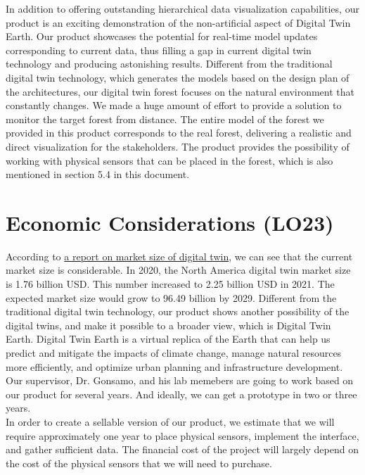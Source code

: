\documentclass{article}
\begin{document}
\noindent In addition to offering outstanding hierarchical data visualization capabilities, our product is an exciting demonstration of the non-artificial aspect of Digital Twin Earth. Our product showcases the potential for real-time model updates corresponding to current data, thus filling a gap in current digital twin technology and producing astonishing results. Different from the traditional digital twin technology, which generates the models based on the design plan of the architectures, our digital twin forest focuses on the natural environment that constantly changes. We made a huge amount of effort to provide a solution to monitor the target forest from distance. The entire model of the forest we provided in this product corresponds to the real forest, delivering a realistic and direct visualization for the stakeholders. The product provides the possibility of working with physical sensors that can be placed in the forest, which is also mentioned in section 5.4 in this document.

\noindent 


\section{Economic Considerations (LO23)}


According to \href{https://www.fortunebusinessinsights.com/digital-twin-market-106246}{a report on market size of digital twin}, we can see that the current market size is considerable. In 2020, the North America digital twin market size is 1.76 billion USD. This number increased to 2.25 billion USD in 2021. The expected market size would grow to 96.49 billion by 2029. Different from the traditional digital twin technology, our product shows another possibility of the digital twins, and make it possible to a broader view, which is Digital Twin Earth. Digital Twin Earth is a virtual replica of the Earth that can help us predict and mitigate the impacts of climate change, manage natural resources more efficiently, and optimize urban planning and infrastructure development. Our supervisor, Dr. Gonsamo, and his lab memebers are going to work based on our product for several years. And ideally, we can get a prototype in two or three years. \\

\noindent In order to create a sellable version of our product, we estimate that we will require approximately one year to place physical sensors, implement the interface, and gather sufficient data. The financial cost of the project will largely depend on the cost of the physical sensors that we will need to purchase.\\
\end{document}
